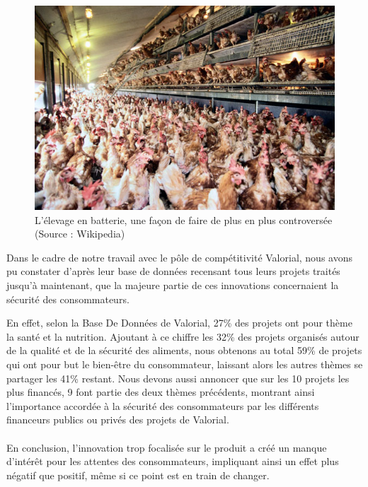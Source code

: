 \documentclass[a4paper,12pt]{report}
\begin{document}
			\begin{figure}[!h]
			\centering
			\includegraphics[scale=0.75]{Illustrations/PouleBatterie.jpg}
			\caption{L'élevage en batterie, une façon de faire de plus en plus controversée\\(Source : Wikipedia)}
			\label{PouleBatterie}
			\end{figure}
			
			Dans le cadre de notre travail avec le pôle de compétitivité Valorial, nous avons pu constater d’après leur base de données recensant tous leurs projets traités jusqu’à maintenant, que la majeure partie de ces innovations concernaient la sécurité des consommateurs. 
			
			En effet, selon la Base De Données de Valorial, 27\% des projets ont pour thème la santé et la nutrition. Ajoutant à ce chiffre les 32\% des projets  organisés autour de la qualité et de la sécurité des aliments, nous obtenons au total 59\% de projets qui ont pour but le bien-être du consommateur, laissant alors les autres thèmes se partager les 41\% restant. Nous devons aussi annoncer que sur les 10 projets les plus financés, 9 font partie des deux thèmes précédents, montrant ainsi l’importance accordée à la sécurité des consommateurs par les différents financeurs publics ou privés des projets de Valorial.
			
			\paragraph{}En conclusion, l'innovation trop focalisée sur le produit a créé un manque d'intérêt pour les attentes des consommateurs, impliquant ainsi un effet plus négatif que positif, même si ce point est en train de changer.
						
\end{document}
